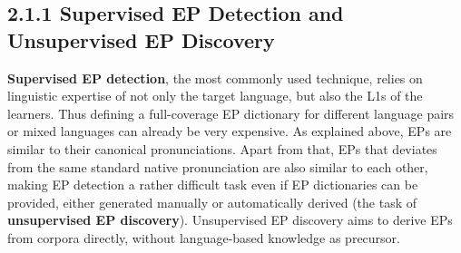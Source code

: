 \documentclass[nobib]{tufte-handout}
\begin{document}
\subsection{2.1.1 \textbf{Supervised EP Detection and Unsupervised EP Discovery}}
\textbf{Supervised EP detection}, the most commonly used technique, relies on linguistic expertise of not only the target language, but also the L1s of the learners. Thus defining a full-coverage EP dictionary for different language pairs or mixed languages can already be very expensive. As explained above, EPs are similar to their canonical pronunciations. Apart from that, EPs that deviates from the same standard native pronunciation are also similar to each other, making EP detection a rather difficult task even if EP dictionaries can be provided, either generated manually or automatically derived (the task of \textbf{unsupervised EP discovery}). Unsupervised EP discovery aims to derive EPs from corpora directly, without language-based knowledge as precursor. \\
\end{document}
